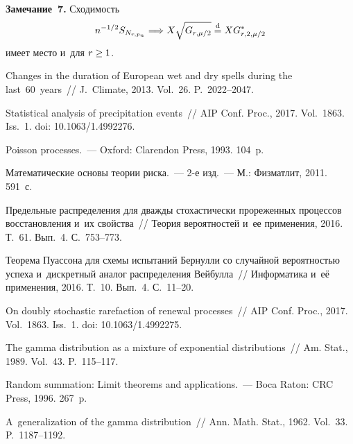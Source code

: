 \begin{multicols}{2}
\smallskip

\noindent
\textbf{Замечание~7.} Сходимость 
$$
n^{-1/2}S_{N_{r,p_n}}\Longrightarrow
X\sqrt{G_{r,\mu/2}}\stackrel{\mathrm{d}}{=} X G^*_{r,2,\mu/2}
$$ 
имеет место и~для $r\hm\ge 1$.

{\small\frenchspacing
 {%
 \begin{thebibliography}{99}


Changes in the duration of European wet and dry spells during
the last~60~years~// J.~Climate, 2013. Vol.~26. P.~2022--2047.

 Statistical analysis of precipitation events~//
AIP Conf. Proc., 2017.
Vol.~1863. Iss.~1. doi: 10.1063/1.4992276.

 Poisson processes.~--- Oxford: Clarendon Press, 1993.
104~p.

Математические основы теории риска.~--- 2-е изд.~--- М.: Физматлит, 2011.
591~с.

 Предельные распределения для
дваж\-ды стохастически прореженных процессов вос\-ста\-нов\-ле\-ния и~их
свойства~// Теория вероятностей и~ее применения, 2016. Т.~61. Вып.~4. С.~753--773.

 Теорема Пуассона
для схемы испытаний Бернулли со случайной вероятностью успеха 
и~дискретный аналог распределения Вейбулла~// Информатика и~её
применения, 2016. Т.~10. Вып.~4. С.~11--20.

 On doubly
stochastic rarefaction of renewal processes~//  
AIP Conf. Proc., 2017. Vol.~1863. Iss.~1. doi: 10.1063/1.4992275.

The gamma distribution as a mixture of exponential distributions~//
Am. Stat., 1989. Vol.~43. P.~115--117.

 Random summation:
Limit theorems and applications.~--- Boca Raton: CRC Press, 1996.
267~p.

 A~generalization of the gamma
distribution~// Ann. Math. Stat., 1962. Vol.~33.
P.~1187--1192.


\end{thebibliography}}}
\end{multicols}
